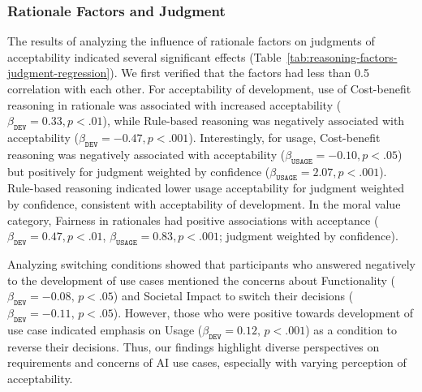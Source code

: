 % 

\subsubsection{Rationale Factors and Judgment}
The results of analyzing the influence of rationale factors on judgments of acceptability indicated several significant effects (Table~\ref{tab:reasoning-factors-judgment-regression}). We first verified that the factors had less than 0.5 correlation with each other. For acceptability of development, use of Cost-benefit reasoning in rationale was associated with increased acceptability ($\beta_{\texttt{DEV}} = 0.33, p<.01$), while Rule-based reasoning was negatively associated with acceptability ($\beta_{\texttt{DEV}} = -0.47, p<.001$). Interestingly, for usage, Cost-benefit reasoning was negatively associated with acceptability ($\beta_{\texttt{USAGE}}=-0.10,p<.05$) but positively for judgment weighted by confidence ($\beta_{\texttt{USAGE}}=2.07,p<.001$). Rule-based reasoning indicated lower usage acceptability for judgment weighted by confidence, consistent with acceptability of development. In the moral value category, Fairness in rationales had positive associations with acceptance ($\beta_{\texttt{DEV}} = 0.47, p<.01$, $\beta_{\texttt{USAGE}} = 0.83, p<.001$; judgment weighted by confidence). 

Analyzing switching conditions showed that participants who answered negatively to the development of use cases mentioned the concerns about Functionality ($\beta_{\texttt{DEV}} = -0.08, \, p<.05$) and Societal Impact to switch their decisions ($\beta_{\texttt{DEV}} = -0.11, \, p<.05$). However, those who were positive towards development of use case indicated emphasis on Usage ($\beta_{\texttt{DEV}} = 0.12, \, p<.001$) as a condition to reverse their decisions. Thus, our findings highlight diverse perspectives on requirements and concerns of AI use cases, especially with varying perception of acceptability. 
